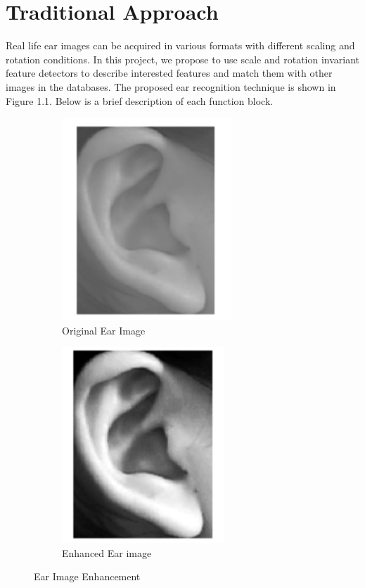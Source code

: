 \section{Traditional Approach} 
Real life ear images can be acquired in various formats with different scaling and rotation conditions. In this project, we propose to use scale and rotation invariant feature detectors to describe interested features and match them with other images in the databases. The proposed ear recognition technique is shown in Figure 1.1. Below is a brief description of each function block.


\begin{figure}
\centering
\begin{subfigure}{.5\textwidth}
  \centering
  \includegraphics[width=.4\linewidth]{Figures/Figure3}
  \caption{Original Ear Image}
  \label{fig:sub1}
\end{subfigure}%
\begin{subfigure}{.5\textwidth}
  \centering
  \includegraphics[width=.4\linewidth]{Figures/Figure4}
  \caption{Enhanced Ear image}
  \label{fig:sub2}
\end{subfigure}
\caption{Ear Image Enhancement}
\label{fig:test1}
\end{figure}

